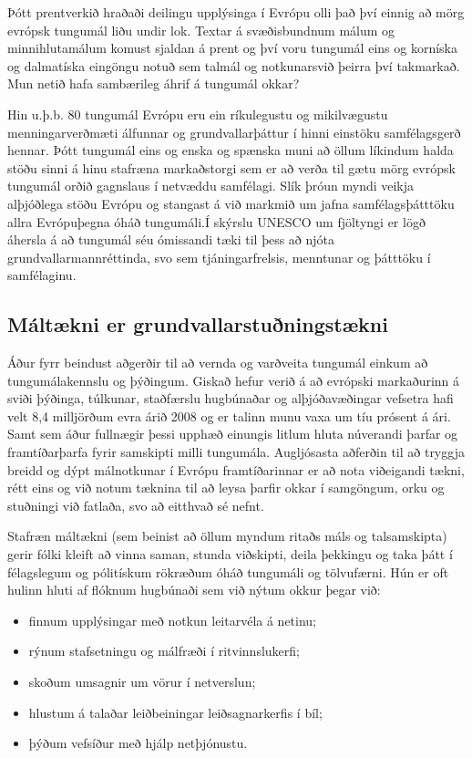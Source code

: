 \documentclass{../../metanetpaper}
\begin{document}
\begin{multicols}{2}
Þótt prentverkið hraðaði deilingu upplýsinga í Evrópu olli það því einnig að mörg evrópsk tungumál liðu undir lok. Textar á svæðisbundnum málum og minnihlutamálum komust sjaldan á prent og því voru tungumál eins og korníska og dalmatíska eingöngu notuð sem talmál og notkunarsvið þeirra því takmarkað. Mun netið hafa sambærileg áhrif á tungumál okkar? 

Hin u.þ.b. 80 tungumál Evrópu eru ein ríkulegustu og mikilvægustu menningarverðmæti álfunnar og grundvallarþáttur í hinni einstöku samfélagsgerð hennar\cite{EC2}. Þótt tungumál eins og enska og spænska muni að öllum líkindum halda stöðu sinni á hinu stafræna markaðstorgi sem er að verða til gætu mörg evrópsk tungumál orðið gagnslaus í netvæddu samfélagi. Slík þróun myndi veikja alþjóðlega stöðu Evrópu og stangast á við markmið um jafna samfélagsþátttöku allra Evrópuþegna óháð tungumáli.Í skýrslu UNESCO um fjöltyngi er lögð áhersla á að tungumál séu ómissandi tæki til þess að njóta grundvallarmannréttinda, svo sem tjáningarfrelsis, menntunar og þátttöku í samfélaginu\cite{Unesco1}.

\subsection{Máltækni er grundvallarstuðningstækni}

Áður fyrr beindust aðgerðir til að vernda og varðveita tungumál einkum að tungumálakennslu og þýðingum. Giskað hefur verið á að evrópski markaðurinn á sviði þýðinga, túlkunar, staðfærslu hugbúnaðar og alþjóðavæðingar vefsetra hafi velt 8,4 milljörðum evra árið 2008 og er talinn munu vaxa um tíu prósent á ári\cite{EC3}. Samt sem áður fullnægir þessi upphæð einungis litlum hluta núverandi þarfar og framtíðarþarfa fyrir samskipti milli tungumála. Augljósasta aðferðin til að tryggja breidd og dýpt málnotkunar í Evrópu framtíðarinnar er að nota viðeigandi tækni, rétt eins og við notum tæknina til að leysa þarfir okkar í samgöngum, orku og stuðningi við fatlaða, svo að eitthvað sé nefnt. 

Stafræn máltækni (sem beinist að öllum myndum ritaðs máls og talsamskipta) gerir fólki kleift að vinna saman, stunda viðskipti, deila þekkingu og taka þátt í félagslegum og pólitískum rökræðum óháð tungumáli og tölvufærni. Hún er oft hulinn hluti af flóknum hugbúnaði sem við nýtum okkur þegar við:

\begin{itemize}
\item finnum upplýsingar með notkun leitarvéla á netinu;
\item rýnum stafsetningu og málfræði í ritvinnslukerfi;
\item skoðum umsagnir um vörur í netverslun;
\item hlustum á talaðar leiðbeiningar leiðsagnarkerfis í bíl;
\item þýðum vefsíður með hjálp netþjónustu.
\end{itemize}


\end{multicols}
\end{document}
